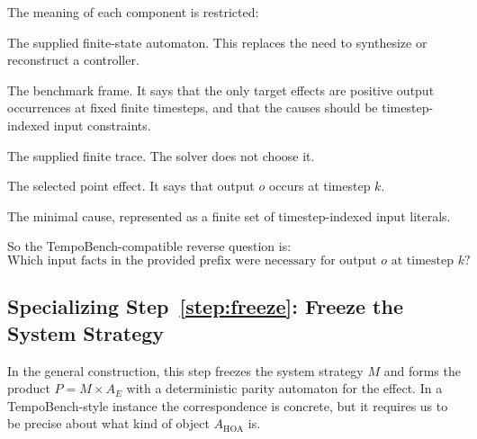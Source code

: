 \documentclass[11pt]{article}
\theoremstyle{remark}
\newcommand{\Frame}{\mathfrak{F}}
\begin{document}
The meaning of each component is restricted:
\begin{description}[leftmargin=2.8cm,style=nextline]
  \item[\(A_{\mathrm{HOA}}\)]
  The supplied finite-state automaton. This replaces the need to synthesize or
  reconstruct a controller.

  \item[\(\Frame_{\mathrm{TB}}\)]
  The benchmark frame. It says that the only target effects are positive output
  occurrences at fixed finite timesteps, and that the causes should be
  timestep-indexed input constraints.

  \item[\(\tau_{\le n}\)]
  The supplied finite trace. The solver does not choose it.

  \item[\(E_{\Frame}=X^k o\)]
  The selected point effect. It says that output \(o\) occurs at timestep \(k\).

  \item[\(C^\star\)]
  The minimal cause, represented as a finite set of timestep-indexed
  input literals.
\end{description}

So the TempoBench-compatible reverse question is:
\[
  \text{Which input facts in the provided prefix were necessary for output }
  o \text{ at timestep } k?
\]

\subsection{Specializing Step~\ref{step:freeze}: Freeze the System Strategy}

In the general construction, this step freezes the system strategy \(M\) and
forms the product \(P=M\times A_E\) with a deterministic parity automaton for
the effect. In a TempoBench-style instance the correspondence is concrete, but
it requires us to be precise about what kind of object \(A_{\mathrm{HOA}}\) is.
\end{document}
